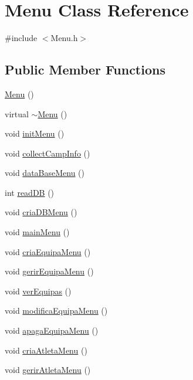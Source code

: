 \hypertarget{class_menu}{}\section{Menu Class Reference}
\label{class_menu}


{\ttfamily \#include $<$Menu.\+h$>$}

\subsection*{Public Member Functions}
\begin{DoxyCompactItemize}
\item 
\hyperlink{class_menu_ad466dd83355124a6ed958430450bfe94}{Menu} ()
\item 
virtual \hyperlink{class_menu_a5bf168cbb40e28e718ced8f248b3d37a}{$\sim$\+Menu} ()
\item 
void \hyperlink{class_menu_aebc90f39203524becf5ad750269d5d82}{init\+Menu} ()
\item 
void \hyperlink{class_menu_a074b52485720028ef39ea0b08814ae2b}{collect\+Camp\+Info} ()
\item 
void \hyperlink{class_menu_ab0fbce7a52bf8645228d4c158e063884}{data\+Base\+Menu} ()
\item 
int \hyperlink{class_menu_a310382052e9a7be64087faa0a7a23b56}{read\+D\+B} ()
\item 
void \hyperlink{class_menu_a490d329e802b593d65bdbd3bc91894e6}{cria\+D\+B\+Menu} ()
\item 
void \hyperlink{class_menu_aef9edee86d2ea460606361c92e061583}{main\+Menu} ()
\item 
void \hyperlink{class_menu_abfcbe8297cbb0d379ef3544a0e7cefe2}{cria\+Equipa\+Menu} ()
\item 
void \hyperlink{class_menu_a454034ca59b406effdd2200d2082f012}{gerir\+Equipa\+Menu} ()
\item 
void \hyperlink{class_menu_a5ee7414221236ab04057cd344f5c7ce1}{ver\+Equipas} ()
\item 
void \hyperlink{class_menu_a3c905bac8a34821ba997bb5f4d68a74b}{modifica\+Equipa\+Menu} ()
\item 
void \hyperlink{class_menu_a3589195c7a93816549f3eb7c136847ea}{apaga\+Equipa\+Menu} ()
\item 
void \hyperlink{class_menu_a1962c805cb253521aff855ea2d7e5e8c}{cria\+Atleta\+Menu} ()
\item 
void \hyperlink{class_menu_ab13ac922c5b90d76543a1c33dd68adfb}{gerir\+Atleta\+Menu} ()
\item 

\end{DoxyCompactItemize}
